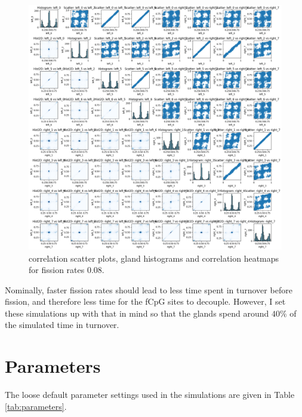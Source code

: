 \begin{figure}[h]
    \centering
    \includegraphics[width=\textwidth]{Chapter_methylation/figures/sensitivity_migrate2.png}
    \caption{correlation scatter plots, gland histograms and correlation heatmaps for fission rates $0.08$.}
    \label{fig:sensitivity_migrate2}
\end{figure}
\clearpage
Nominally, faster fission rates should lead to less time spent in turnover before fission, and therefore less time for the fCpG sites to decouple. However, I set these simulations up with that in mind so that the glands spend around $40\%$ of the simulated time in turnover.

\section{Parameters}
The loose default parameter settings used in the simulations are given in Table \ref{tab:parameters}.

